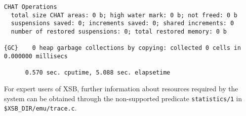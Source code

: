 \begin{description}
{\begin{verbatim}
CHAT Operations
  total size CHAT areas: 0 b; high water mark: 0 b; not freed: 0 b
  suspensions saved: 0; increments saved: 0; shared increments: 0
  number of restored suspensions: 0; total restored memory: 0 b

{GC}    0 heap garbage collections by copying: collected 0 cells in 0.000000 millisecs

      0.570 sec. cputime, 5.088 sec. elapsetime 
\end{verbatim}} 
     For expert users of XSB, further information about resources
     required by the system can be obtained through the non-supported
     predicate {\tt statistics/1} in {\tt \$XSB\_DIR/emu/trace.c}.




\end{description}
